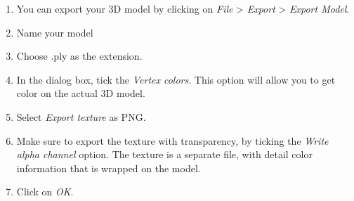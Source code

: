 \documentclass[10pt,letter,english]{article}
\begin{document}
\begin{enumerate}
    \item You can export your 3D model by clicking on \textit{File} > \textit{Export} > \textit{Export Model}.
    \item Name your model
    \item Choose .ply as the extension.
    \item In the dialog box, tick the \textit{Vertex colors}. This option will allow you to get color on the actual 3D model.
    \item Select \textit{Export texture} as PNG.
    \item Make sure to export the texture with transparency, by ticking the \textit{Write alpha channel} option. The texture is a separate file, with detail color information that is wrapped on the model.
    \item Click on \textit{OK}.
\end{enumerate}









\end{document}
